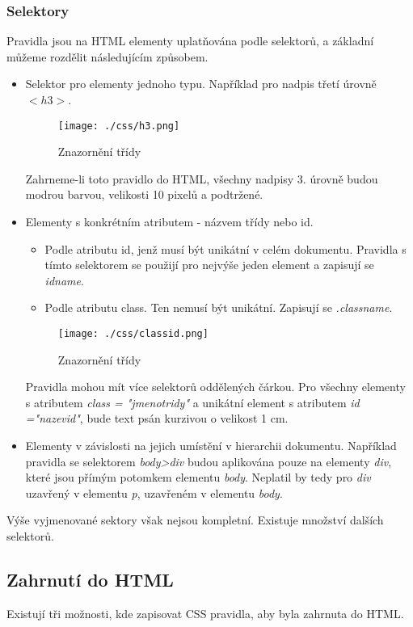 \documentclass[main.tex]{subfiles}
\begin{document}
	\subsubsection{Selektory}
Pravidla jsou na HTML elementy uplatňována podle selektorů, a základní můžeme rozdělit následujícím způsobem.
\begin{itemize}
	\item Selektor pro elementy jednoho typu. Například pro nadpis třetí úrovně  $<h3>$.
		\begin{figure}[h]
			\centering
			\texttt{[image: ./css/h3.png]}
			\caption{Znazornění třídy}
		\end{figure}
		Zahrneme-li toto pravidlo do HTML, všechny nadpisy 3. úrovně budou modrou barvou, velikosti 10 pixelů a podtržené.
	\item Elementy s konkrétním atributem - názvem třídy nebo id.
		\begin{itemize}
			\item Podle atributu id, jenž musí být unikátní v celém dokumentu. Pravidla s tímto selektorem se použijí pro nejvýše jeden element a zapisují se \textit{idname}. %
			\item Podle atributu class. Ten nemusí být unikátní. Zapisují se \textit{.classname}.
		\end{itemize}


		\begin{figure}[h]
			\centering
			\texttt{[image: ./css/classid.png]}
			\caption{Znazornění třídy}
		\end{figure}
		Pravidla mohou mít více selektorů oddělených čárkou. Pro všechny elementy s atributem \textit{class = "jmenotridy"} a unikátní element s atributem \textit{id ="nazevid"}, bude text psán kurzivou o velikost 1 cm.
	\item Elementy v závislosti na jejich umístění v hierarchii dokumentu. Například pravidla se selektorem \textit{body>div} budou aplikována pouze na elementy \textit{div}, které jsou přímým potomkem elementu \textit{body}. Neplatil by tedy pro \textit{div} uzavřený v elementu \textit{p}, uzavřeném v elementu \textit{body}.
\end{itemize}
Výše vyjmenované sektory však nejsou kompletní. Existuje množství dalších selektorů. \cite{web:cz:selektory}

\subsection{Zahrnutí do HTML}
Existují tři možnosti, kde zapisovat CSS pravidla, aby byla zahrnuta do HTML.
\end{document}
